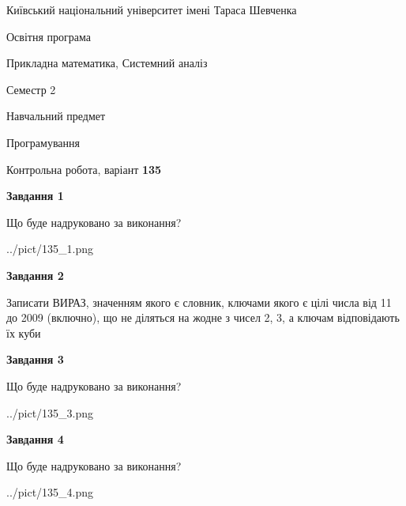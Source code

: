 \documentclass[12pt, ukrainian]{article}
\begin{document}
{{\begin {small}\par
{ \center  Київський національний університет імені Тараса Шевченка \par}
{\parbox {5 cm}{Освітня програма \hfill}{\parbox {8 cm}{Прикладна математика, Системний аналіз \hfill}}\parbox {5 cm}{\hfill Семестр 2}}\par
{\parbox {5 cm} {Навчальний предмет \hfill}\parbox {7 cm}{Програмування \hfill}\parbox {6cm}{\hfill}\par}\vspace{-7pt} \end{small}}{\center Контрольна робота, варіант  \No \textbf
{ 135 }\par}}
{
\begin {large}
{\begin {center}\textbf{Завдання 1}\end {center}}\par
Що буде надруковано за виконання?\par\par
\begin{center}
	{../pict/135_1.png}
\end{center}
\newpage

{\begin {center}\textbf{Завдання 2}\end {center}}\par
Записати ВИРАЗ, значенням якого є словник, ключами якого є цілі числа від 11 до 2009 (включно), що не діляться на жодне з чисел 2, 3, а ключам відповідають їх куби\par
\newpage

{\begin {center}\textbf{Завдання 3}\end {center}}\par
Що буде надруковано за виконання?\par
\begin{center}
	{../pict/135_3.png}
\end{center}
\newpage

{\begin {center}\textbf{Завдання 4}\end {center}}\par
Що буде надруковано за виконання?\par
\begin{center}
	{../pict/135_4.png}
\end{center}
\newpage


\end{large}}
\end{document}
